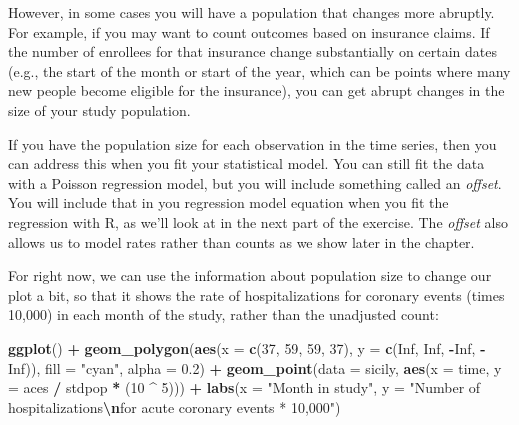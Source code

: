 \documentclass[
]{book}
\newenvironment{Shaded}{\begin{snugshade}}{\end{snugshade}}
\newcommand{\AttributeTok}[1]{\textcolor[rgb]{0.13,0.29,0.53}{#1}}
\newcommand{\ConstantTok}[1]{\textcolor[rgb]{0.56,0.35,0.01}{#1}}
\newcommand{\DecValTok}[1]{\textcolor[rgb]{0.00,0.00,0.81}{#1}}
\newcommand{\FloatTok}[1]{\textcolor[rgb]{0.00,0.00,0.81}{#1}}
\newcommand{\FunctionTok}[1]{\textcolor[rgb]{0.13,0.29,0.53}{\textbf{#1}}}
\newcommand{\NormalTok}[1]{#1}
\newcommand{\SpecialCharTok}[1]{\textcolor[rgb]{0.81,0.36,0.00}{\textbf{#1}}}
\newcommand{\StringTok}[1]{\textcolor[rgb]{0.31,0.60,0.02}{#1}}
\begin{document}
However, in some cases you will have a population that changes more abruptly. For example, if you may want to count outcomes based on insurance claims. If the number of enrollees for that insurance change substantially on certain dates (e.g., the start of the month or start of the year, which can be points where many new people become eligible for the insurance), you can get abrupt changes in the size of your study population.

If you have the population size for each observation in the time series, then you can address this when you fit your statistical model. You can still fit the data with a Poisson regression model, but you will include something called an \emph{offset}. You will include that in you regression model equation when you fit the regression with R, as we'll look at in the next part of the exercise. The \emph{offset} also allows us to model rates rather than counts as we show later in the chapter.

For right now, we can use the information about population size to change our plot a bit, so that it shows the rate of hospitalizations for coronary events (times 10,000) in each month of the study, rather than the unadjusted count:

\begin{Shaded}
\begin{Highlighting}[]
\FunctionTok{ggplot}\NormalTok{() }\SpecialCharTok{+} 
  \FunctionTok{geom\_polygon}\NormalTok{(}\FunctionTok{aes}\NormalTok{(}\AttributeTok{x =} \FunctionTok{c}\NormalTok{(}\DecValTok{37}\NormalTok{, }\DecValTok{59}\NormalTok{, }\DecValTok{59}\NormalTok{, }\DecValTok{37}\NormalTok{), }
                   \AttributeTok{y =} \FunctionTok{c}\NormalTok{(}\ConstantTok{Inf}\NormalTok{, }\ConstantTok{Inf}\NormalTok{, }\SpecialCharTok{{-}}\ConstantTok{Inf}\NormalTok{, }\SpecialCharTok{{-}}\ConstantTok{Inf}\NormalTok{)), }
               \AttributeTok{fill =} \StringTok{"cyan"}\NormalTok{, }\AttributeTok{alpha =} \FloatTok{0.2}\NormalTok{) }\SpecialCharTok{+} 
  \FunctionTok{geom\_point}\NormalTok{(}\AttributeTok{data =}\NormalTok{ sicily, }\FunctionTok{aes}\NormalTok{(}\AttributeTok{x =}\NormalTok{ time, }\AttributeTok{y =}\NormalTok{ aces }\SpecialCharTok{/}\NormalTok{ stdpop }\SpecialCharTok{*}\NormalTok{ (}\DecValTok{10} \SpecialCharTok{\^{}} \DecValTok{5}\NormalTok{))) }\SpecialCharTok{+} 
  \FunctionTok{labs}\NormalTok{(}\AttributeTok{x =} \StringTok{"Month in study"}\NormalTok{, }
       \AttributeTok{y =} \StringTok{"Number of hospitalizations}\SpecialCharTok{\textbackslash{}n}\StringTok{for acute coronary events * 10,000"}\NormalTok{)}
\end{Highlighting}
\end{Shaded}
\end{document}

